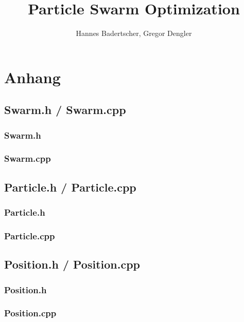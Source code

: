 \documentclass{article}
\title{Particle Swarm Optimization}
\author{Hannes Badertscher, Gregor Dengler}
\numberwithin{equation}{section}
\numberwithin{figure}{section}
\begin{document}
	
	
	
	
	
	
	
	
	
	
	\newpage
	
	
	
	\newpage
	\section{Anhang}
	\subsection{Swarm.h / Swarm.cpp}
	\subsubsection{Swarm.h}
	
	\newpage
	\subsubsection{Swarm.cpp}
	
	\newpage
	\subsection{Particle.h / Particle.cpp}
	\subsubsection{Particle.h}
	
	\newpage
	\subsubsection{Particle.cpp}
	
	\newpage
	\subsection{Position.h / Position.cpp}
	\subsubsection{Position.h}
	
	\newpage
	\subsubsection{Position.cpp}
	
	\newpage
\end{document}
